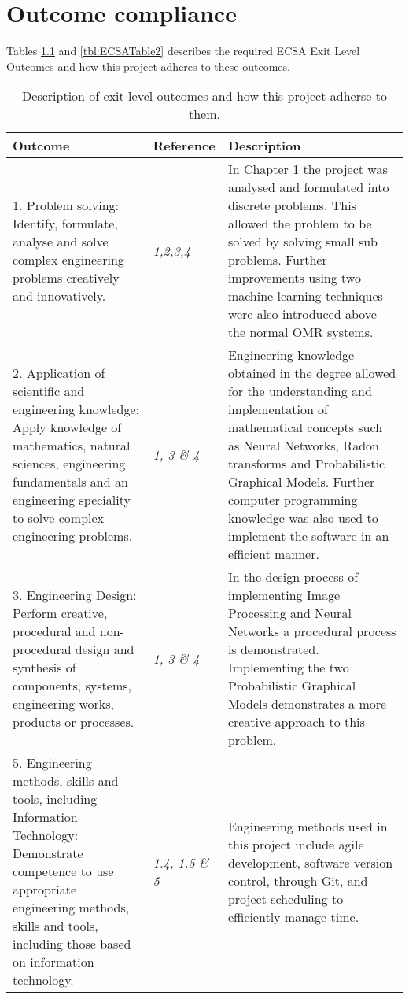 \chapter{Outcome compliance}
\label{ap:outCompliance}
\graphicspath{{Appendix2/Appendix2figures/}}
Tables \ref{tbl:ECSATable1} and \ref{tbl:ECSATable2} describes the required ECSA Exit Level Outcomes and how this project adheres to these outcomes.
\begin{table}
\caption{Description of exit level outcomes and how this project adherse to them.} \label{tbl:ECSATable1}
\begin{tabular}{|p{6cm}|p{3cm}|p{6cm}|}
\hline
\textbf{Outcome}&\textbf{Reference}&\textbf{Description}\\
\hline
1. Problem solving: Identify, formulate, analyse and solve complex engineering problems creatively and innovatively. & \textit{1,2,3,4} &In Chapter 1 the project was analysed and formulated into discrete problems. This allowed the problem to be solved by solving small sub problems. Further improvements using two machine learning techniques were also introduced above the normal OMR systems.\\
\hline
2. Application of scientific and engineering knowledge: Apply knowledge of mathematics, natural sciences,
engineering fundamentals and an engineering speciality to solve complex engineering problems. & \textit{1, 3 \& 4} & Engineering knowledge obtained in the degree allowed for the understanding and implementation of mathematical concepts such as Neural Networks, Radon transforms and Probabilistic Graphical Models. Further computer programming knowledge was also used to implement the software in an efficient manner.\\
\hline
3. Engineering Design: Perform creative, procedural and non-procedural design and synthesis of components, systems,
engineering works, products or processes. & \textit{1, 3 \& 4} & In the design process of implementing Image Processing and Neural Networks a procedural process is demonstrated. Implementing the two Probabilistic Graphical Models demonstrates a more creative approach to this problem.\\
\hline
5. Engineering methods, skills and tools, including Information Technology: Demonstrate competence to use
appropriate engineering methods, skills and tools, including those based on information technology. &\textit{1.4, 1.5 \& 5}  & Engineering methods used in this project include agile development, software version control, through Git, and project scheduling to efficiently manage time.\\
\hline
\end{tabular}
\end{table}
